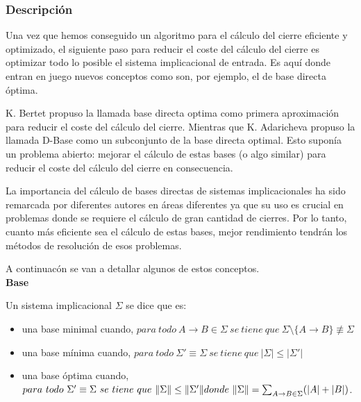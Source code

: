 \subsubsection{Descripci\'on} 


Una vez que hemos conseguido un algoritmo para el c\'alculo del cierre eficiente y optimizado, el siguiente paso para reducir el coste del c\'alculo del cierre es optimizar todo lo posible el sistema implicacional de entrada. Es aqu\'i donde entran en juego nuevos conceptos como son, por ejemplo, el de base directa \'optima.

K. Bertet \cite{BERTET20102155} propuso la llamada base directa optima como primera aproximaci\'on para reducir el coste del c\'alculo del cierre. Mientras que  K. Adaricheva \cite{Adaricheva} propuso la llamada D-Base como un subconjunto de la base directa optimal. Esto supon\'ia un problema abierto: mejorar el c\'alculo de estas bases (o algo similar) para reducir el coste del c\'alculo del cierre en consecuencia.

La importancia del c\'alculo de bases directas de sistemas implicacionales ha sido remarcada por diferentes autores en \'areas diferentes ya que su uso es crucial en problemas donde se requiere el c\'alculo de gran cantidad de cierres. Por lo tanto, cuanto m\'as eficiente sea el c\'alculo de estas bases, mejor rendimiento tendr\'an los m\'etodos de resoluci\'on de esos problemas. 

A continuac\'on se van a detallar algunos de estos conceptos.\\


\textbf{Base}

Un sistema implicacional \( \Sigma \) se dice que es:
\begin{itemize}
    \item una base minimal cuando,  \( para \ todo \ A \to B \in \Sigma \ se \ tiene \ que \ \Sigma \setminus \{A \to B\} \not\equiv \Sigma\)

    \item una base m\'inima cuando,  \( para \ todo \ \Sigma' \equiv \Sigma \ se \ tiene \ que \ |\Sigma| \leq |\Sigma'|\)

    \item una base \'optima cuando,  \( para \ todo \ \Sigma' \equiv \Sigma \ se \ tiene \ que \ \|\Sigma\| \leq \|\Sigma'\| \\ donde \ \|\Sigma\| = 
    \sum_{\substack{A \to B \in \Sigma}} (|A|+|B|) \).
\end{itemize}

